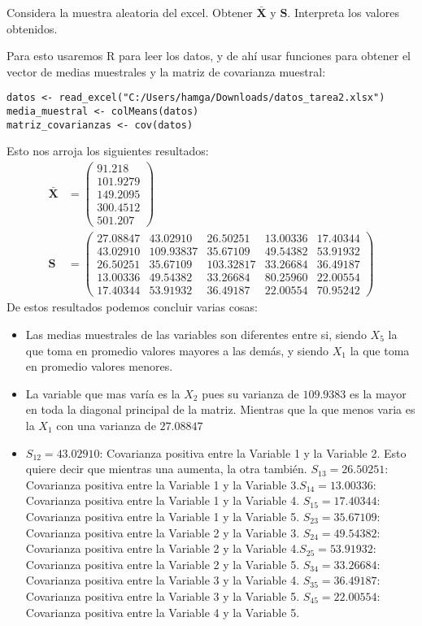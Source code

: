 \begin{problem}{8}
Considera la muestra aleatoria del excel. Obtener $\mathbf{\bar{X}}$ y $\mathbf{S}$. Interpreta los valores obtenidos.
\end{problem}
\begin{sol}
Para esto usaremos R para leer los datos, y de ahí usar funciones para obtener el vector de medias muestrales y la matriz de covarianza muestral:
\begin{verbatim}
datos <- read_excel("C:/Users/hamga/Downloads/datos_tarea2.xlsx")
media_muestral <- colMeans(datos)
matriz_covarianzas <- cov(datos) 
\end{verbatim}
Esto nos arroja los siguientes resultados:
\begin{align*}
\mathbf{\bar{X}} &= 
\begin{pmatrix}
91.218 \\
101.9279\\
149.2095 \\
300.4512 \\
501.207
\end{pmatrix} \\
\mathbf{S} &=
\begin{pmatrix}
27.08847 & 43.02910 & 26.50251 & 13.00336 & 17.40344 \\
43.02910 & 109.93837 & 35.67109 & 49.54382 & 53.91932 \\
26.50251 & 35.67109 & 103.32817 & 33.26684 & 36.49187 \\
13.00336 & 49.54382 & 33.26684 & 80.25960 & 22.00554 \\
17.40344 & 53.91932 & 36.49187 & 22.00554 & 70.95242
\end{pmatrix}
\end{align*}
De estos resultados podemos concluir varias cosas:
\begin{itemize}
\item Las medias muestrales de las variables son diferentes entre si, siendo $X_5$ la que toma en promedio valores mayores a las demás, y siendo $X_1$ la que toma en promedio valores menores.
\item La variable que mas varía es la $X_2$ pues su varianza de $109.9383$ es la mayor en toda la diagonal principal de la matriz. Mientras que la que menos varia es la $X_1$ con una varianza de $27.08847$
\item \( S_{12} = 43.02910 \): Covarianza positiva entre la Variable 1 y la Variable 2. Esto quiere decir que mientras una aumenta, la otra también. \( S_{13} = 26.50251 \): Covarianza positiva entre la Variable 1 y la Variable 3.\( S_{14} = 13.00336 \): Covarianza positiva entre la Variable 1 y la Variable 4. \( S_{15} = 17.40344 \): Covarianza positiva entre la Variable 1 y la Variable 5. \( S_{23} = 35.67109 \): Covarianza positiva entre la Variable 2 y la Variable 3. \( S_{24} = 49.54382 \): Covarianza positiva entre la Variable 2 y la Variable 4.\( S_{25} = 53.91932 \): Covarianza positiva entre la Variable 2 y la Variable 5. \( S_{34} = 33.26684 \): Covarianza positiva entre la Variable 3 y la Variable 4. \( S_{35} = 36.49187 \): Covarianza positiva entre la Variable 3 y la Variable 5. \( S_{45} = 22.00554 \): Covarianza positiva entre la Variable 4 y la Variable 5.
\end{itemize}
\end{sol}